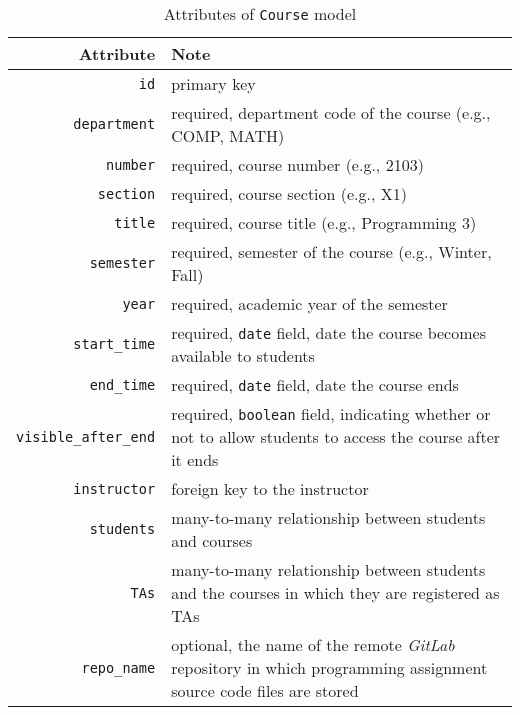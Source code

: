 \begin{table}[H]
    \centering
    \caption{Attributes of \texttt{Course} model}
    \label{tab:COURSE_ATTR}
    \renewcommand{\arraystretch}{1}
    \begin{tabular}[H]{r|p{4in}}
        \hline
        Attribute & Note \\
        \hline
        \hline
        \texttt{id} & primary key \\
        \hline
        \texttt{department} & required, department code of the course
            (e.g., COMP, MATH) \\
        \hline
        \texttt{number} & required, course number (e.g., 2103)\\
        \hline
        \texttt{section} & required, course section (e.g., X1) \\
        \hline
        \texttt{title} & required, course title (e.g., Programming 3)\\
        \hline
        \texttt{semester} & required, semester of the course
            (e.g., Winter, Fall) \\
        \hline
        \texttt{year} & required, academic year of the semester \\
        \hline
        \texttt{start\_time} & required, \texttt{date} field, date the course
            becomes available to  students \\
        \hline
        \texttt{end\_time} & required, \texttt{date} field, date the course
            ends \\
        \hline
        \texttt{visible\_after\_end} & required, \texttt{boolean} field,
            indicating whether or not to allow students to access the course
            after it ends \\
        \hline
        \hline

        \texttt{instructor} & foreign key to the instructor \\
        \hline
        \texttt{students} & many-to-many relationship between students and
            courses \\
        \hline
        \texttt{TAs} & many-to-many relationship between students and the
            courses in which they are registered as TAs \\

        \hline
        \hline

        \texttt{repo\_name} & optional, the name of the remote \emph{GitLab}
            repository  in 
            which programming assignment source code files  are stored \\
        \hline
        \hline


\end{tabular}
\end{table}
